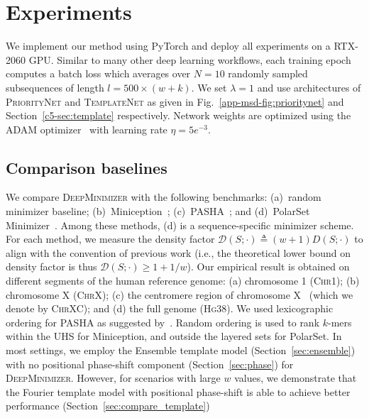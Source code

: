 \section{Experiments}
\label{c5-sec:exp}
We implement our method using PyTorch and deploy all experiments on a RTX-2060 GPU. Similar to many other deep learning workflows, each training epoch computes a batch loss which averages over $N = 10$ randomly sampled subsequences of length $l = 500 \times (w + k)$. We set $\lambda = 1$ and use architectures of \textsc{PriorityNet} and \textsc{TemplateNet} as given in Fig.~\ref{app-msd-fig:prioritynet} and Section~\ref{c5-sec:template} respectively. Network weights are optimized using the ADAM optimizer~\citep{kingma14adam} with learning rate $\eta = 5e^{-3}$. 

\subsection{Comparison baselines} We compare \textsc{DeepMinimizer} with the following benchmarks: (a)~random minimizer baseline; (b)~Miniception~\citep{zheng20miniception}; (c)~PASHA~\citep{ekim20pasha}; and (d)~PolarSet Minimizer~\citep{zheng21}. Among these methods, (d) is a sequence-specific minimizer scheme. For each method, we measure the density factor $\mathcal{D}(S;\cdot) \triangleq (w+1)D(S;\cdot)$ to align with the convention of previous work (i.e., the theoretical lower bound on density factor is thus $\mathcal{D}(S;\cdot) \geq 1 + 1/w$). Our empirical result is obtained on different segments of the human reference genome: (a) chromosome 1 (\textsc{Chr1}); (b) chromosome X (\textsc{ChrX}); (c) the centromere region of chromosome X~\citep{miga19} (which we denote by \textsc{ChrXC}); and (d) the full genome (\textsc{Hg38}). We used lexicographic ordering for PASHA as suggested by~\citet{zheng20miniception}. Random ordering is used to rank $k$-mers within the UHS for Miniception, and outside the layered sets for PolarSet. In most settings, we employ the Ensemble template model (Section~\ref{sec:ensemble}) with no positional phase-shift component (Section~\ref{sec:phase}) for \textsc{DeepMinimizer}. However, for scenarios with large $w$ values, we demonstrate that the Fourier template model with positional phase-shift is able to achieve better performance (Section~\ref{sec:compare_template})

